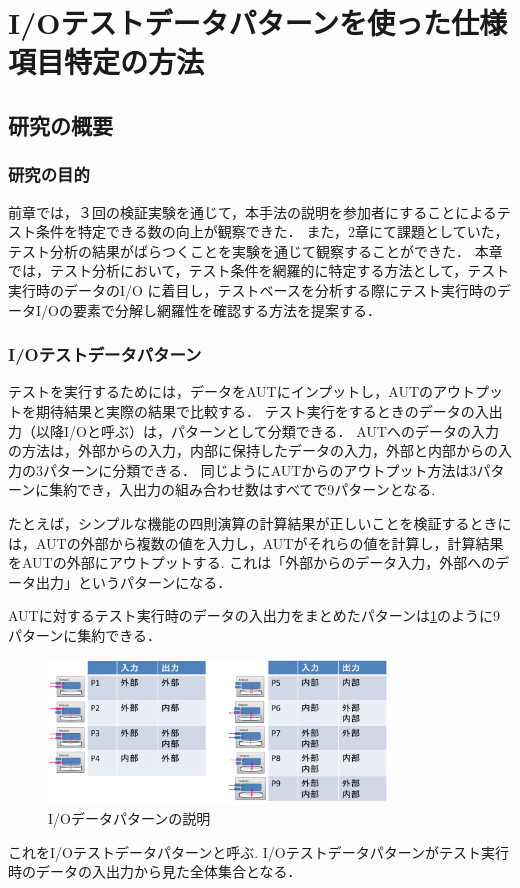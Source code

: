 \documentclass[10pt,a4j]{jarticle}
\begin{document}
\section{I/Oテストデータパターンを使った仕様項目特定の方法}\label{chap:4}
\subsection{研究の概要} \label{sec:4-1}
\subsubsection{研究の目的} \label{sec:4-1-1}
前章では，３回の検証実験を通じて，本手法の説明を参加者にすることによるテスト条件を特定できる数の向上が観察できた．
また，2章にて課題としていた，テスト分析の結果がばらつくことを実験を通じて観察することができた．
本章では，テスト分析において，テスト条件を網羅的に特定する方法として，テスト実行時のデータのI/O に着目し，テストベースを分析する際にテスト実行時のデータI/Oの要素で分解し網羅性を確認する方法を提案する．

\subsubsection{I/Oテストデータパターン} \label{sec:4-1-1}
テストを実行するためには，データをAUTにインプットし，AUTのアウトプットを期待結果と実際の結果で比較する．
テスト実行をするときのデータの入出力（以降I/Oと呼ぶ）は，パターンとして分類できる．
AUTへのデータの入力の方法は，外部からの入力，内部に保持したデータの入力，外部と内部からの入力の3パターンに分類できる．
同じようにAUTからのアウトプット方法は3パターンに集約でき，入出力の組み合わせ数はすべてで9パターンとなる.

たとえば，シンプルな機能の四則演算の計算結果が正しいことを検証するときには，AUTの外部から複数の値を入力し，AUTがそれらの値を計算し，計算結果をAUTの外部にアウトプットする.
これは「外部からのデータ入力，外部へのデータ出力」というパターンになる．

AUTに対するテスト実行時のデータの入出力をまとめたパターンは\ref{fig:D-3-Fig11}のように9パターンに集約できる．
   \begin{figure}[htbp]
 \begin{center}
 \includegraphics[width=9cm]{./image/D-3-Fig5.png}
 \caption{I/Oデータパターンの説明}
 \label{fig:D-3-Fig11}
 \end{center}
  \end{figure}
これをI/Oテストデータパターンと呼ぶ.
I/Oテストデータパターンがテスト実行時のデータの入出力から見た全体集合となる．
\end{document}
